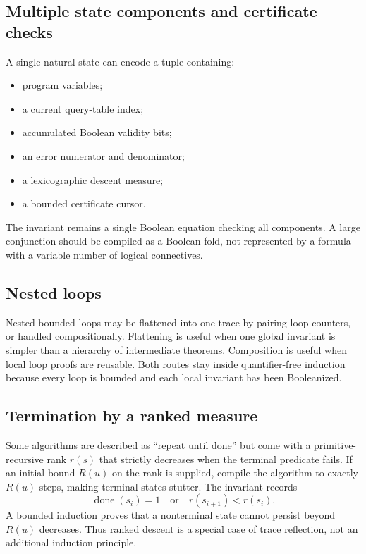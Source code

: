 \subsection{Multiple state components and certificate checks}

A single natural state can encode a tuple containing:
\begin{itemize}
\item program variables;
\item a current query-table index;
\item accumulated Boolean validity bits;
\item an error numerator and denominator;
\item a lexicographic descent measure;
\item a bounded certificate cursor.
\end{itemize}
The invariant remains a single Boolean equation checking all components.  A
large conjunction should be compiled as a Boolean fold, not represented by a
formula with a variable number of logical connectives.

\subsection{Nested loops}

Nested bounded loops may be flattened into one trace by pairing loop counters,
or handled compositionally.  Flattening is useful when one global invariant is
simpler than a hierarchy of intermediate theorems.  Composition is useful when
local loop proofs are reusable.  Both routes stay inside quantifier-free
induction because every loop is bounded and each local invariant has been
Booleanized.

\subsection{Termination by a ranked measure}

Some algorithms are described as ``repeat until done'' but come with a
primitive-recursive rank \(r(s)\) that strictly decreases when the terminal
predicate fails.  If an initial bound \(R(u)\) on the rank is supplied, compile
the algorithm to exactly \(R(u)\) steps, making terminal states stutter.  The
invariant records
\[
 \operatorname{done}(s_i)=1
 \quad\text{or}\quad r(s_{i+1})<r(s_i).
\]
A bounded induction proves that a nonterminal state cannot persist beyond
\(R(u)\) decreases.  Thus ranked descent is a special case of trace reflection,
not an additional induction principle.

